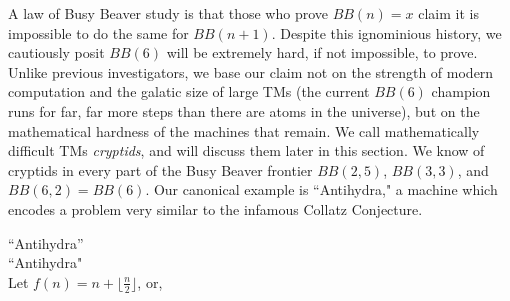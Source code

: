 
A law of Busy Beaver study is that those who prove $BB(n) = x$ claim it is impossible to do the same for $BB(n+1)$. Despite this ignominious history, we cautiously posit $BB(6)$ will be extremely hard, if not impossible, to prove. Unlike previous investigators, we base our claim not on the strength of modern computation and the galatic size of large TMs (the current $BB(6)$ champion runs for far, far more steps than there are atoms in the universe), but on the mathematical hardness of the machines that remain.
We call mathematically difficult TMs \textit{cryptids}, and will discuss them later in this section. We know of cryptids in every part of the Busy Beaver frontier $BB(2,5)$, $BB(3,3)$, and $BB(6,2) = BB(6)$. Our canonical example is ``Antihydra," a machine which encodes a problem very similar to the infamous Collatz Conjecture.

\begin{example}
    ``Antihydra'' \\
    ``Antihydra"  \\
    Let $f(n) = n + \lfloor \frac{n}{2} \rfloor$, or, 
\end{example}
